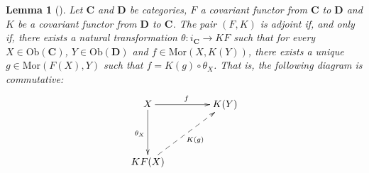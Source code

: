 \documentclass[sn-mathphys-num]{sn-jnl}%
\theoremstyle{thmstyleone}%
\newtheorem{lemma}[theorem]{Lemma}%
\theoremstyle{thmstyletwo}%
\theoremstyle{thmstylethree}%
\begin{document}
\begin{lemma}[\cite{Stonek}]
Let $ \mathbf{C} $ and $ \mathbf{D} $ be  categories, $ F $  a covariant functor from $ \mathbf {C} $ to $ \mathbf {D} $ and $ K $ be a covariant functor from $ \mathbf{D} $ to $ \mathbf{C} $. The pair $ (F, K) $ is adjoint if, and only if, there exists a natural transformation $ \theta: i _ {\mathbf {C}} \to KF $ such that for every $ X \in \text {Ob}(\mathbf{C}) $, $ Y \in \text{Ob} (\mathbf{D}) $ and $ f \in \text{Mor} (X, K (Y)) $, there exists a unique $ g \in \text{Mor} (F (X), Y) $ such that $ f = K (g) \circ \theta_X $. That is, the following diagram is commutative:
$$
\xymatrix@=1.5cm{
X \ar[r]^f \ar[d]_{\theta_X} & K(Y)\\
KF(X)\ar@{-->}[ur]_{K(g)}&
}
$$
\end{lemma}
\end{document}
